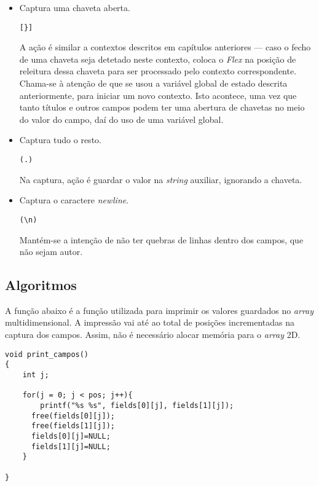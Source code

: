 \begin{itemize}
\item Captura uma chaveta aberta. 

\begin{verbatim}
[}]
\end{verbatim}

A ação é similar a contextos descritos em capítulos anteriores --- caso o fecho
de uma chaveta seja detetado neste contexto, coloca o \emph{Flex} na posição de
releitura dessa chaveta para ser processado pelo contexto correspondente.
Chama-se à atenção de que se usou a variável global de estado descrita
anteriormente, para iniciar um novo contexto. Isto acontece, uma vez que tanto
títulos e outros campos podem ter uma abertura de chavetas no meio do valor do
campo, daí do uso de uma variável global.

\item Captura tudo o resto.
\begin{verbatim}
(.)
\end{verbatim}

Na captura, ação é guardar o valor na \emph{string} auxiliar, ignorando
a chaveta. 


\item Captura o caractere \emph{newline}. 
\begin{verbatim}
(\n)
\end{verbatim}

Mantém-se a intenção de não ter quebras de linhas dentro dos campos, que não
sejam autor. 

\end{itemize}


\subsection{Algoritmos}

A função abaixo é a função utilizada para imprimir os valores guardados no
\emph{array} multidimensional. A impressão vai até ao total de posições
incrementadas na captura dos campos. Assim, não é necessário alocar memória para
o \emph{array} 2D. 

\begin{verbatim}
void print_campos()
{
    int j;

    for(j = 0; j < pos; j++){
        printf("%s %s", fields[0][j], fields[1][j]);
      free(fields[0][j]);
      free(fields[1][j]);
      fields[0][j]=NULL;
      fields[1][j]=NULL;
    }

}
\end{verbatim}

